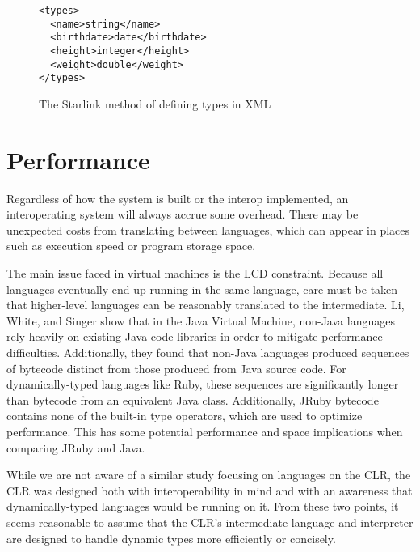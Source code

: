 \documentclass{sig-alternate}
\begin{document}

\begin{figure}
\begin{verbatim}
<types>
  <name>string</name>
  <birthdate>date</birthdate>
  <height>integer</height>
  <weight>double</weight>
</types>
\end{verbatim}
\caption{The Starlink method of defining types in XML}
\label{XMLMeta}
\end{figure}

\section{Performance} \label{performance}
Regardless of how the system is built or the interop implemented, an interoperating system will always accrue some overhead. There may be unexpected costs from translating between languages, which can appear in places such as execution speed or program storage space.

The main issue faced in virtual machines is the LCD constraint. Because all languages eventually end up running in the same language, care must be taken that higher-level languages can be reasonably translated to the intermediate.
Li, White, and Singer \cite{Li:2013} show that in the Java Virtual Machine, non-Java languages rely heavily on existing Java code libraries in order to mitigate performance difficulties. Additionally, they found that non-Java languages produced sequences of bytecode distinct from those produced from Java source code.
For dynamically-typed languages like Ruby, these sequences are significantly longer than bytecode from an equivalent Java class. Additionally, JRuby bytecode contains none of the built-in type operators, which are used to optimize performance. This has some potential performance and space implications when comparing JRuby and Java.


While we are not aware of a similar study focusing on languages on the CLR, the CLR was designed both with interoperability in mind and with an awareness that dynamically-typed languages would be running on it. From these two points, it seems reasonable to assume that the CLR's intermediate language and interpreter are designed to handle dynamic types more efficiently or concisely.
\end{document}
